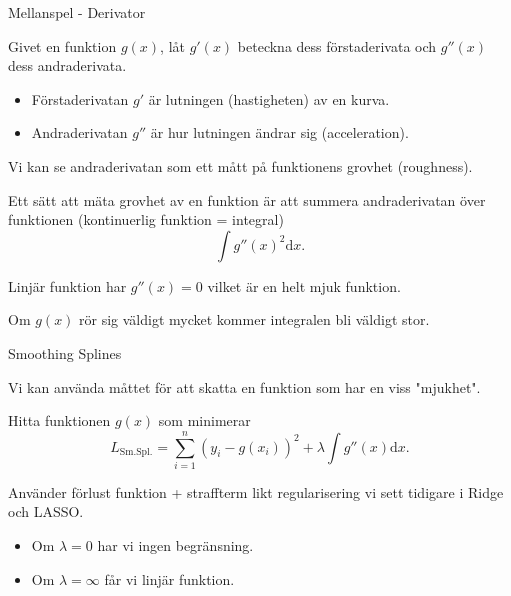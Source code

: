 \documentclass[10pt,english]{beamer}
\begin{document}
\begin{frame}{Mellanspel - Derivator}

    Givet en funktion $g(x)$, låt $g'(x)$ beteckna dess förstaderivata och $g''(x)$ dess andraderivata.

    \begin{itemize}
        \item Förstaderivatan $g'$ är lutningen (hastigheten) av en kurva.
        \item Andraderivatan $g''$ är hur lutningen ändrar sig (acceleration).
    \end{itemize}

    Vi kan se andraderivatan som ett mått på funktionens grovhet (roughness).

    Ett sätt att mäta grovhet av en funktion är att summera andraderivatan över funktionen (kontinuerlig funktion = integral)
    \begin{equation*}
        \int g''(x)^2 \mathrm{d}x.
    \end{equation*}

    Linjär funktion har $g''(x) = 0$ vilket är en helt mjuk funktion.

    Om $g(x)$ rör sig väldigt mycket kommer integralen bli väldigt stor.
\end{frame}

\begin{frame}{Smoothing Splines}

    Vi kan använda måttet för att skatta en funktion som har en viss "mjukhet".

    \begin{greenbox}
        Hitta funktionen $g(x)$ som minimerar
        \begin{equation*}
            L_{\text{Sm.Spl.}} = \sum_{i=1}^{n}(y_i - g(x_i))^2 + \lambda \int g''(x) \mathrm{d}x.
        \end{equation*}
    \end{greenbox}
    
    Använder förlust funktion + straffterm likt regularisering vi sett tidigare i Ridge och LASSO.

    \begin{itemize}
        \item Om $\lambda = 0$ har vi ingen begränsning.
        \item Om $\lambda = \infty$ får vi linjär funktion.
    \end{itemize}
\end{frame}
\end{document}
